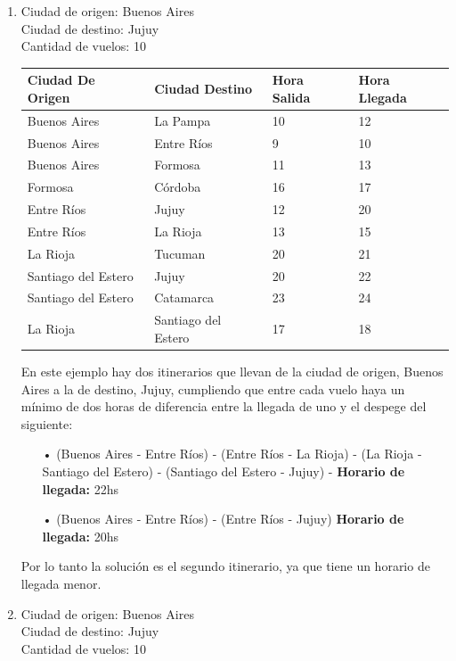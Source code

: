 \documentclass[10pt,a4paper]{article}
\begin{document}
\noindent \begin{enumerate}
\item
Ciudad de origen: Buenos Aires\\
Ciudad de destino: Jujuy\\
Cantidad de vuelos: 10\\

\begin{center}
	\begin{tabular}{| l | l | l | l |}
	\hline
	Ciudad De Origen & Ciudad Destino & Hora Salida & Hora Llegada\\ \hline
	Buenos Aires & La Pampa & 10 &	12\\
	Buenos Aires & Entre Ríos & 9 & 10 \\
	Buenos Aires & Formosa	&	11	& 13\\
	Formosa	& Córdoba	& 16 & 17  \\
	Entre Ríos & Jujuy	& 12 & 20\\
	Entre Ríos & La Rioja	&	13 & 15\\
	La Rioja & Tucuman	&	20 & 21\\
	Santiago del Estero & Jujuy &	20 & 22\\
	Santiago del Estero	& Catamarca & 23 & 24\\
	La Rioja & Santiago del Estero & 17&18\\
	\hline
	\end{tabular}
\end{center}


En este ejemplo hay dos itinerarios que llevan de la ciudad de origen, Buenos Aires a la de destino, Jujuy, cumpliendo que entre cada vuelo haya un mínimo de dos horas de diferencia entre la llegada de uno y el despege del siguiente:
\begin{itemize}
\item[•] (Buenos Aires - Entre Ríos) - (Entre Ríos - La Rioja) - (La Rioja - Santiago del Estero) - (Santiago del Estero - Jujuy) - \textbf{Horario de llegada: } 22hs

\item[•] (Buenos Aires - Entre Ríos) - (Entre Ríos - Jujuy) \textbf{Horario de llegada: } 20hs
\end{itemize}

Por lo tanto la solución es el segundo itinerario, ya que tiene un horario de llegada menor.\\

\item
Ciudad de origen: Buenos Aires\\
Ciudad de destino: Jujuy\\
Cantidad de vuelos: 10\\


\end{enumerate}
\end{document}
